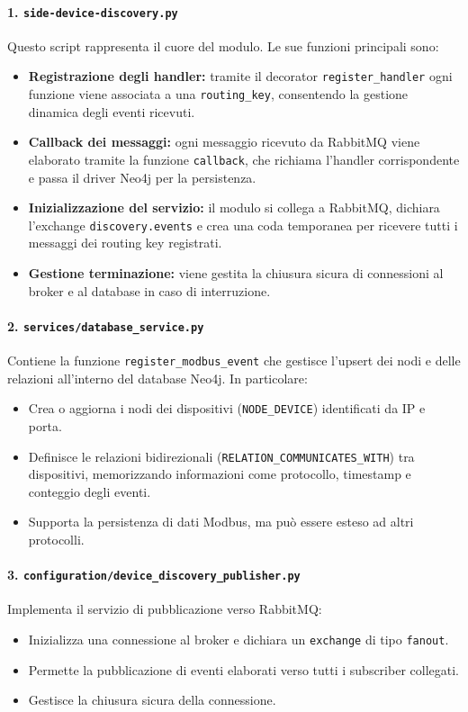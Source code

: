 \paragraph{1. \texttt{side-device-discovery.py}}  
Questo script rappresenta il cuore del modulo. Le sue funzioni principali sono:
\begin{itemize}
    \item \textbf{Registrazione degli handler:} tramite il decorator \texttt{register\_handler} ogni funzione viene associata a una \texttt{routing\_key}, consentendo la gestione dinamica degli eventi ricevuti.
    \item \textbf{Callback dei messaggi:} ogni messaggio ricevuto da RabbitMQ viene elaborato tramite la funzione \texttt{callback}, che richiama l'handler corrispondente e passa il driver Neo4j per la persistenza.
    \item \textbf{Inizializzazione del servizio:} il modulo si collega a RabbitMQ, dichiara l'exchange \texttt{discovery.events} e crea una coda temporanea per ricevere tutti i messaggi dei routing key registrati.
    \item \textbf{Gestione terminazione:} viene gestita la chiusura sicura di connessioni al broker e al database in caso di interruzione.
\end{itemize}

\paragraph{2. \texttt{services/database\_service.py}}  
Contiene la funzione \texttt{register\_modbus\_event} che gestisce l'upsert dei nodi e delle relazioni all'interno del database Neo4j. In particolare:
\begin{itemize}
    \item Crea o aggiorna i nodi dei dispositivi (\texttt{NODE\_DEVICE}) identificati da IP e porta.
    \item Definisce le relazioni bidirezionali (\texttt{RELATION\_COMMUNICATES\_WITH}) tra dispositivi, memorizzando informazioni come protocollo, timestamp e conteggio degli eventi.
    \item Supporta la persistenza di dati Modbus, ma può essere esteso ad altri protocolli.
\end{itemize}

\paragraph{3. \texttt{configuration/device\_discovery\_publisher.py}}  
Implementa il servizio di pubblicazione verso RabbitMQ:
\begin{itemize}
    \item Inizializza una connessione al broker e dichiara un \texttt{exchange} di tipo \texttt{fanout}.
    \item Permette la pubblicazione di eventi elaborati verso tutti i subscriber collegati.
    \item Gestisce la chiusura sicura della connessione.
\end{itemize}

